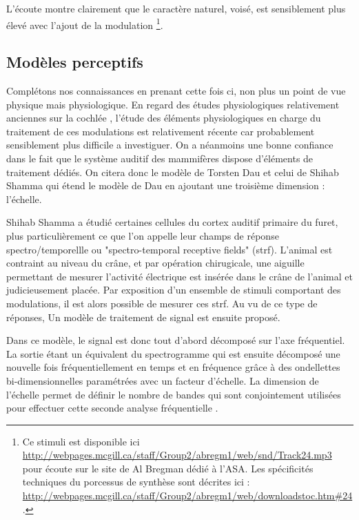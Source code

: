 L'écoute montre clairement que le caractère naturel, voisé, est sensiblement plus élevé avec l'ajout de la modulation \footnote{Ce stimuli est disponible ici \url{http://webpages.mcgill.ca/staff/Group2/abregm1/web/snd/Track24.mp3} pour écoute sur le site de Al Bregman dédié à l'ASA. Les spécificités techniques du porcessus de synthèse sont décrites ici : \url{http://webpages.mcgill.ca/staff/Group2/abregm1/web/downloadstoc.htm\#24}.}.

\subsection{Modèles perceptifs}

Complétons nos connaissances en prenant cette fois ci, non plus un point de vue physique mais physiologique. En regard des études physiologiques relativement anciennes sur la cochlée \cite{}, l'étude des éléments physiologiques en charge du traitement de ces modulations est relativement récente car probablement sensiblement plus difficile a investiguer. On a néanmoins une bonne confiance dans le fait que le système auditif des mammifères dispose d'éléments de traitement dédiés. On citera donc le modèle de Torsten Dau \cite{dau1997modeling} et celui de Shihab Shamma \cite{fritz2003rapid} qui étend le modèle de Dau en ajoutant une troisième dimension : l'échelle.

Shihab Shamma a étudié certaines cellules du cortex auditif primaire du furet, plus particulièrement ce que l'on appelle leur champs de réponse spectro/temporellle ou "spectro-temporal receptive fields" (strf). L'animal est contraint au niveau du crâne, et par opération chirugicale, une aiguille permettant de mesurer l'activité électrique est insérée dans le crâne de l'animal et judicieusement placée. Par exposition d'un ensemble de stimuli comportant des modulations, il est alors possible de mesurer ces strf. Au vu de ce type de réponses, Un modèle de traitement de signal est ensuite proposé.

Dans ce modèle, le signal est donc tout d'abord décomposé sur l'axe fréquentiel. La sortie étant un équivalent du spectrogramme qui est ensuite décomposé une nouvelle fois fréquentiellement en temps et en fréquence grâce à des ondellettes bi-dimensionnelles paramétrées avec un facteur d'échelle. La dimension de l'échelle permet de définir le nombre de bandes qui sont conjointement utilisées pour effectuer cette seconde analyse fréquentielle .

